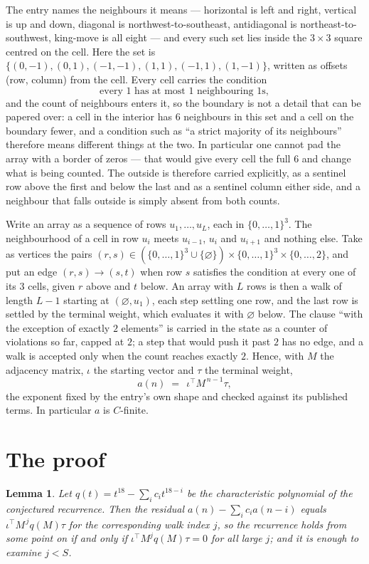 \documentclass[11pt,a4paper]{article}
\theoremstyle{plain}
\newtheorem{lemma}[theorem]{Lemma}
\theoremstyle{definition}
\begin{document}
The entry names the neighbours it means --- horizontal is left and right, vertical is up and
down, diagonal is northwest-to-southeast, antidiagonal is northeast-to-southwest, king-move is
all eight --- and every such set lies inside the $3\times3$ square centred on the cell. Here
the set is $\{(0,-1), (0,1), (-1,-1), (1,1), (-1,1), (1,-1)\}$, written as offsets (row, column) from the cell. Every cell carries
the condition
\[
\text{every 1 has at most 1 neighbouring 1s},
\]
and the count of neighbours enters it, so the boundary is not a detail that can be papered
over: a cell in the interior has $6$ neighbours in this set and a cell on the boundary
fewer, and a condition such as ``a strict majority of its neighbours'' therefore means
different things at the two. In particular one cannot pad the array with a border of zeros ---
that would give every cell the full $6$ and change what is being counted. The outside is
therefore carried
explicitly, as a sentinel row above the first and below the last and as a sentinel column
either side, and a neighbour that falls outside is simply absent from both counts.

Write an array as a sequence of rows $u_1,\dots,u_L$, each in
$\{0,\dots,1\}^{3}$. The neighbourhood of a cell in row $u_i$ meets $u_{i-1}$,
$u_i$ and $u_{i+1}$ and nothing else. Take as vertices the pairs
$(r,s)\in(\{0,\dots,1\}^{3}\cup\{\varnothing\})\times\{0,\dots,1\}^{3} \times \{0,\dots,2\}$,
and put an edge $(r,s)\to(s,t)$ when row $s$ satisfies the condition at every one of its
$3$ cells, given $r$ above and $t$ below. An array with $L$ rows is then a walk of length
$L-1$ starting at $(\varnothing,u_1)$, each step settling one row, and the last row is
settled by the terminal weight, which evaluates it with $\varnothing$ below. The clause ``with the exception of exactly $2$ elements'' is carried in
the state as a counter of violations so far, capped at $2$; a step that would push it past
$2$ has no edge, and a walk is accepted only when the count reaches exactly $2$. Hence,
with $M$ the adjacency matrix, $\iota$ the starting vector and $\tau$ the terminal weight,
\[
a(n)\;=\;\,\iota^{\!\top}M^{\,n-1}\tau ,
\]
the exponent fixed by the entry's own shape and checked against its published terms. In
particular $a$ is $C$-finite.

\section{The proof}

\begin{lemma}\label{lem:crit}
Let $q(t)=t^{18}-\sum_i c_it^{18-i}$ be the characteristic polynomial of the
conjectured recurrence. Then the residual $a(n)-\sum_ic_ia(n-i)$ equals
$\iota^{\!\top}M^{\,j}q(M)\tau$ for the corresponding walk index $j$, so the
recurrence holds from some point on if and only if $\iota^{\!\top}M^{j}q(M)\tau=0$ for all
large $j$; and it is enough to examine $j<S$.
\end{lemma}
\end{document}
